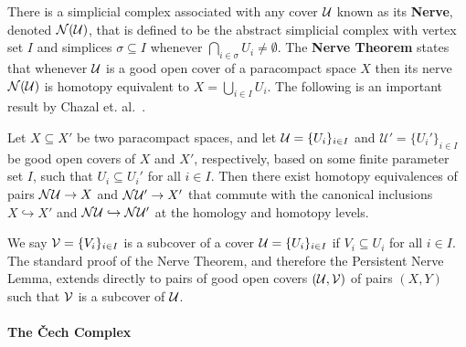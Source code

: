 There is a simplicial complex associated with any cover $\mathcal{U}$ known as its \textbf{Nerve}, denoted $\mathcal{N}(\mathcal{U})$, that is defined to be the abstract simplicial complex with vertex set $I$ and simplices $\sigma\subseteq I$ whenever $\bigcap_{i\in\sigma} U_i\neq \emptyset$.
The \textbf{Nerve Theorem} states that whenever $\mathcal{U}$ is a good open cover of a paracompact space $X$ then its nerve $\mathcal{N}(\mathcal{U})$ is homotopy equivalent to $X = \bigcup_{i\in I} U_i$.
The following is an important result by Chazal et. al.~\cite{chazal08towards}.

\begin{lemma}\label{lem:pers_nerve}
  Let $X\subseteq X'$ be two paracompact spaces, and let $\mathcal{U} = \{U_i\}_{i\in I}$ and $\mathcal{U}' = \{U_i'\}_{i\in I}$ be good open covers of $X$ and $X'$, respectively, based on some finite parameter set $I$, such that $U_i\subseteq U_i'$ for all $i\in I$.
  Then there exist homotopy equivalences of pairs $\mathcal{N}\mathcal{U}\to X$ and $\mathcal{N}\mathcal{U}'\to X'$ that commute with the canonical inclusions $X \hookrightarrow X'$ and $\mathcal{N}\mathcal{U}\hookrightarrow \mathcal{N}\mathcal{U}'$ at the homology and homotopy levels.
\end{lemma}

We say $\mathcal{V} = \{V_i\}_{i\in I}$ is a subcover of a cover $\mathcal{U} = \{U_i\}_{i\in I}$ if $V_i\subseteq U_i$ for all $i\in I$.
The standard proof of the Nerve Theorem, and therefore the Persistent Nerve Lemma, extends directly to pairs of good open covers $(\mathcal{U}, \mathcal{V})$ of pairs $(X, Y)$ such that $\mathcal{V}$ is a subcover of $\mathcal{U}$.


\paragraph{The \v Cech Complex}


